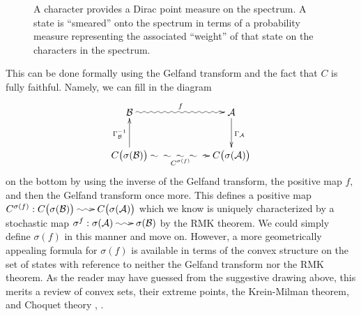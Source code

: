\documentclass[12pt]{article}
\makeatletter
\edef\t{\pgfmathresult}%
\theoremstyle{theorem}
\theoremstyle{definition}
\numberwithin{equation}{section}
\let\a=\alpha \let\b=\beta \let\g=\gamma \let\de=\delta \let\e=\epsilon
\let\s=\sigma \let\t=\tau \let\u=\upsilon \let\f=\phi \let\c=\chi
\newcommand{\be}{\begin{equation}}
\newcommand{\ee}{\end{equation}}
\newcommand{\<}{\langle}
\renewcommand{\>}{\rangle}
\def\R{{{\mathbb R}}}
\def\mA{{{\mathcal{A}}}}
\def\mB{{{\mathcal{B}}}}
\newcommand{\stoch}{\;\xy0;/r.25pc/:\ar@{~>}(3,0);(-3,0);\endxy\;}
\makeatother
\begin{document}
\begin{figure}
\centering
  \phantom{wxyz}
\caption{A character provides a Dirac point measure on the 
spectrum. A state is ``smeared'' onto the spectrum in terms of a 
probability measure representing the associated ``weight'' of that state
on the characters in the spectrum.}
\label{fig:stateconvexspectrum}
\end{figure}
This can be done formally using the Gelfand transform
and the fact that $C$ is fully faithful. Namely, we can fill in the 
diagram 
\be
\xy0;/r.25pc/:
(-17.5,7.5)*+{\mB}="B";
(17.5,7.5)*+{\mA}="A";
(-17.5,-7.5)*+{C\big(\s(\mB)\big)}="CsB";
(17.5,-7.5)*+{C\big(\s(\mA)\big)}="CsA";
{\ar@{~>}^{f}"B";"A"};
{\ar"CsB";"B"^{\G_{\mB}^{-1}}};
{\ar"A";"CsA"^{\G_{\mA}}};
{\ar@{~~>}_{C^{\s(f)}}"CsB";"CsA"};
\endxy
\ee
on the bottom by using the inverse of the Gelfand transform, 
the positive map $f,$ and then 
the Gelfand transform once more. This defines a positive map 
$C^{\s(f)}:C\big(\s(\mB)\big)\stoch C\big(\s(\mA)\big)$
which we know is uniquely characterized by a 
stochastic map $\s^{f}:\s(\mA)\stoch\s(\mB)$ by the RMK theorem.  
We could simply define $\s(f)$ in this manner and move on. 
However, a more geometrically appealing 
formula for $\s(f)$ is available in terms of the convex structure on
the set of states with reference to neither the Gelfand transform
nor the RMK theorem. 
As the reader may have guessed from the suggestive drawing above, 
this merits a review of convex sets, 
their extreme points, the Krein-Milman theorem, and Choquet theory
\cite{Si11}, \cite{Ph01}. 
\end{document}
